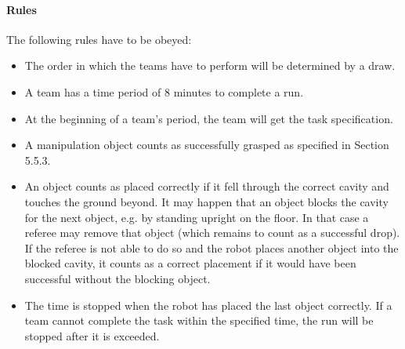 \paragraph{Rules}
The following rules have to be obeyed:

\begin{itemize}

\item The order in which the teams have to perform will be determined by a draw.
\item A team has a time period of 8 minutes to complete a run.
\item At the beginning of a team’s period, the team will get the task specification. 
\item A manipulation object counts as successfully grasped as specified in Section 5.5.3.
\item An object counts as placed correctly if it fell through the correct cavity and touches the ground beyond. It may happen that an object blocks the cavity for the next object, e.g. by standing upright on the floor. In that case a referee may remove that object (which remains to count as a successful drop). If the referee is not able to do so and the robot places another object into the blocked cavity, it counts as a correct placement if it would have been successful without the blocking object.
\item The time is stopped when the robot has placed the last object correctly. If a team cannot complete the task within the specified time, the run will be stopped after it is exceeded.  

\end{itemize}

%


